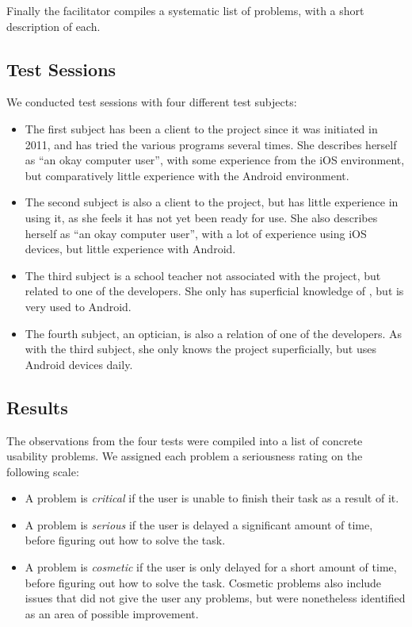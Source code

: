 Finally the facilitator compiles a systematic list of problems, with a short description of each.

\subsection{Test Sessions}
We conducted test sessions with four different test subjects:
\begin{itemize}
	\item The first subject has been a client to the \giraf project since it was initiated in 2011, and has tried the various programs several times. 
	She describes herself as ``an okay computer user'', with some experience from the iOS environment, but comparatively little experience with the Android environment. 
	\item The second subject is also a client to the \giraf project, but has little experience in using it, as she feels it has not yet been ready for use. 
	She also describes herself as ``an okay computer user'', with a lot of experience using iOS devices, but little experience with Android. 
	\item The third subject is a school teacher not associated with the \giraf project, but related to one of the developers. 
	She only has superficial knowledge of \giraf, but is very used to Android.
	\item The fourth subject, an optician, is also a relation of one of the developers. 
	As with the third subject, she only knows the \giraf project superficially, but uses Android devices daily.
\end{itemize}

\subsection{Results}
The observations from the four tests were compiled into a list of concrete usability problems. 
We assigned each problem a seriousness rating on the following scale:
\begin{itemize}
	\item A problem is \textit{critical} if the user is unable to finish their task as a result of it.
	\item A problem is \textit{serious} if the user is delayed a significant amount of time, before figuring out how to solve the task.
	\item A problem is \textit{cosmetic} if the user is only delayed for a short amount of time, before figuring out how to solve the task. 
	Cosmetic problems also include issues that did not give the user any problems, but were nonetheless identified as an area of possible improvement.
\end{itemize}

